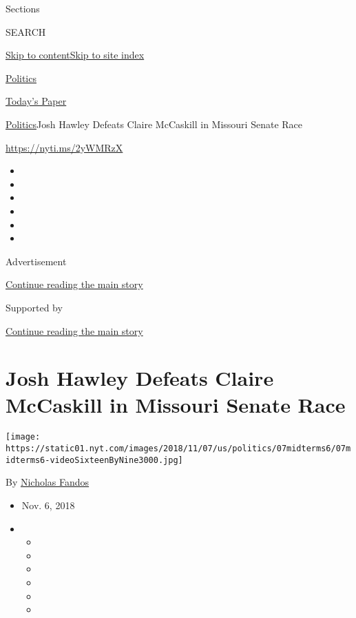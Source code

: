 Sections

SEARCH

\protect\hyperlink{site-content}{Skip to
content}\protect\hyperlink{site-index}{Skip to site index}

\href{https://www.nytimes.com/section/politics}{Politics}

\href{https://myaccount.nytimes.com/auth/login?response_type=cookie\&client_id=vi}{}

\href{https://www.nytimes.com/section/todayspaper}{Today's Paper}

\href{/section/politics}{Politics}\textbar{}Josh Hawley Defeats Claire
McCaskill in Missouri Senate Race

\url{https://nyti.ms/2yWMRzX}

\begin{itemize}
\item
\item
\item
\item
\item
\item
\end{itemize}

Advertisement

\protect\hyperlink{after-top}{Continue reading the main story}

Supported by

\protect\hyperlink{after-sponsor}{Continue reading the main story}

\hypertarget{josh-hawley-defeats-claire-mccaskill-in-missouri-senate-race}{%
\section{Josh Hawley Defeats Claire McCaskill in Missouri Senate
Race}\label{josh-hawley-defeats-claire-mccaskill-in-missouri-senate-race}}

\texttt{[image: https://static01.nyt.com/images/2018/11/07/us/politics/07midterms6/07midterms6-videoSixteenByNine3000.jpg]}

By \href{https://www.nytimes.com/by/nicholas-fandos}{Nicholas Fandos}

\begin{itemize}
\item
  Nov. 6, 2018
\item
  \begin{itemize}
  \item
  \item
  \item
  \item
  \item
  \item
  \end{itemize}
\end{itemize}

